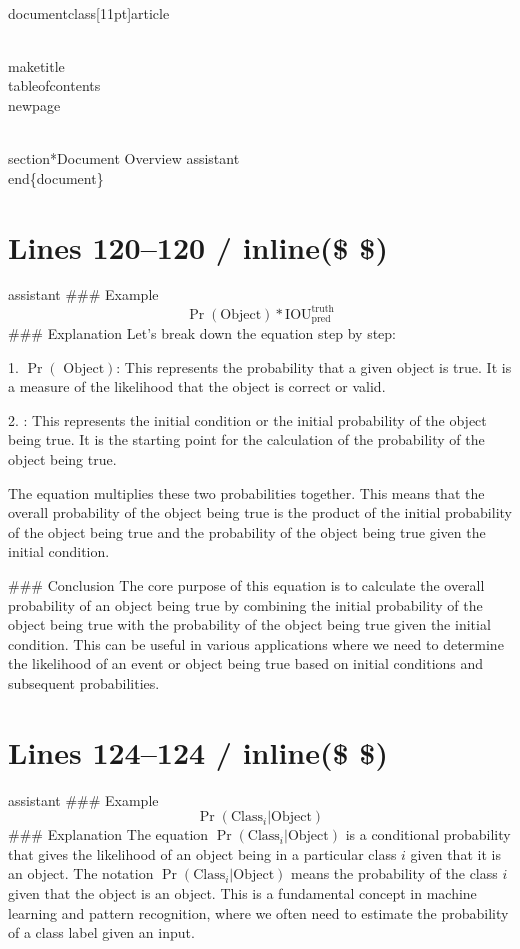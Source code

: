 \\documentclass[11pt]{article}
\begin{document}
\\maketitle
\\tableofcontents
\\newpage

\\section*{Document Overview}
assistant
\\end\{document\}

\newpage

\section*{Lines 120–120 / inline(\$ \$) }
assistant
### Example
$$
\Pr(\textrm{Object}) * \textrm{IOU}_{\textrm{pred}}^{\textrm{truth}}
$$
### Explanation
Let's break down the equation step by step:

1. \(\Pr(\textrm{ Object})\): This represents the probability that a given object is true. It is a measure of the likelihood that the object is correct or valid.

2. : This represents the initial condition or the initial probability of the object being true. It is the starting point for the calculation of the probability of the object being true.

The equation multiplies these two probabilities together. This means that the overall probability of the object being true is the product of the initial probability of the object being true and the probability of the object being true given the initial condition.

### Conclusion
The core purpose of this equation is to calculate the overall probability of an object being true by combining the initial probability of the object being true with the probability of the object being true given the initial condition. This can be useful in various applications where we need to determine the likelihood of an event or object being true based on initial conditions and subsequent probabilities.


\section*{Lines 124–124 / inline(\$ \$) }
assistant
### Example
$$
\Pr(\textrm{Class}_i | \textrm{Object})
$$
### Explanation
The equation \(\Pr(\textrm{Class}_i | \textrm{Object})\) is a conditional probability that gives the likelihood of an object being in a particular class \(i\) given that it is an object. The notation \(\Pr(\textrm{Class}_i | \textrm{Object})\) means the probability of the class \(i\) given that the object is an object. This is a fundamental concept in machine learning and pattern recognition, where we often need to estimate the probability of a class label given an input.
\end{document}
